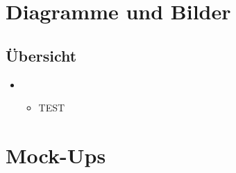 \documentclass[Bachelorarbeit.tex]{subfiles}
\begin{document}
\chapter{Diagramme und Bilder}
\label{chap:diagramme_und_bilder}




\section{Übersicht}
\begin{itemize} 
\item {}
\begin{itemize}
\item TEST
\end{itemize}



\end{itemize}

\newpage
\chapter*{Mock-Ups}
\label{sec:mock_ups}
\end{document}
